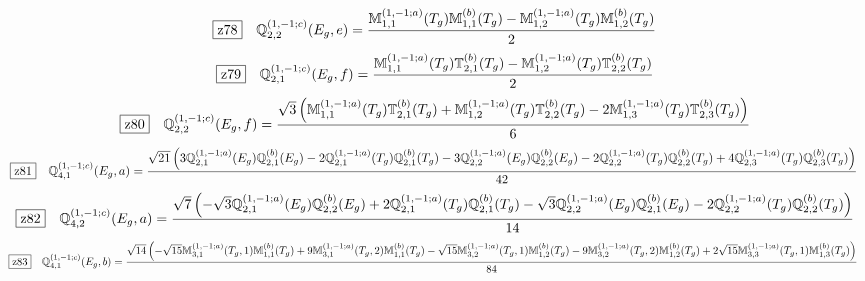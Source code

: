 \documentclass[fleqn,10pt,landscape]{jsarticle}
\begin{document}
\begin{dmath*}
\hspace*{3mm}\fbox{z78}\quad \mathbb{Q}_{2,2}^{(1,-1;c)}(E_{g},e)=\frac{\mathbb{M}_{1,1}^{(1,-1;a)}(T_{g}) \mathbb{M}_{1,1}^{(b)}(T_{g}) - \mathbb{M}_{1,2}^{(1,-1;a)}(T_{g}) \mathbb{M}_{1,2}^{(b)}(T_{g})}{2}
\end{dmath*}
\begin{dmath*}
\hspace*{3mm}\fbox{z79}\quad \mathbb{Q}_{2,1}^{(1,-1;c)}(E_{g},f)=\frac{\mathbb{M}_{1,1}^{(1,-1;a)}(T_{g}) \mathbb{T}_{2,1}^{(b)}(T_{g}) - \mathbb{M}_{1,2}^{(1,-1;a)}(T_{g}) \mathbb{T}_{2,2}^{(b)}(T_{g})}{2}
\end{dmath*}
\begin{dmath*}
\hspace*{3mm}\fbox{z80}\quad \mathbb{Q}_{2,2}^{(1,-1;c)}(E_{g},f)=\frac{\sqrt{3} \left(\mathbb{M}_{1,1}^{(1,-1;a)}(T_{g}) \mathbb{T}_{2,1}^{(b)}(T_{g}) + \mathbb{M}_{1,2}^{(1,-1;a)}(T_{g}) \mathbb{T}_{2,2}^{(b)}(T_{g}) - 2 \mathbb{M}_{1,3}^{(1,-1;a)}(T_{g}) \mathbb{T}_{2,3}^{(b)}(T_{g})\right)}{6}
\end{dmath*}
\begin{dmath*}
\hspace*{3mm}\fbox{z81}\quad \mathbb{Q}_{4,1}^{(1,-1;c)}(E_{g},a)=\frac{\sqrt{21} \left(3 \mathbb{Q}_{2,1}^{(1,-1;a)}(E_{g}) \mathbb{Q}_{2,1}^{(b)}(E_{g}) - 2 \mathbb{Q}_{2,1}^{(1,-1;a)}(T_{g}) \mathbb{Q}_{2,1}^{(b)}(T_{g}) - 3 \mathbb{Q}_{2,2}^{(1,-1;a)}(E_{g}) \mathbb{Q}_{2,2}^{(b)}(E_{g}) - 2 \mathbb{Q}_{2,2}^{(1,-1;a)}(T_{g}) \mathbb{Q}_{2,2}^{(b)}(T_{g}) + 4 \mathbb{Q}_{2,3}^{(1,-1;a)}(T_{g}) \mathbb{Q}_{2,3}^{(b)}(T_{g})\right)}{42}
\end{dmath*}
\begin{dmath*}
\hspace*{3mm}\fbox{z82}\quad \mathbb{Q}_{4,2}^{(1,-1;c)}(E_{g},a)=\frac{\sqrt{7} \left(- \sqrt{3} \mathbb{Q}_{2,1}^{(1,-1;a)}(E_{g}) \mathbb{Q}_{2,2}^{(b)}(E_{g}) + 2 \mathbb{Q}_{2,1}^{(1,-1;a)}(T_{g}) \mathbb{Q}_{2,1}^{(b)}(T_{g}) - \sqrt{3} \mathbb{Q}_{2,2}^{(1,-1;a)}(E_{g}) \mathbb{Q}_{2,1}^{(b)}(E_{g}) - 2 \mathbb{Q}_{2,2}^{(1,-1;a)}(T_{g}) \mathbb{Q}_{2,2}^{(b)}(T_{g})\right)}{14}
\end{dmath*}
\begin{dmath*}
\hspace*{3mm}\fbox{z83}\quad \mathbb{Q}_{4,1}^{(1,-1;c)}(E_{g},b)=\frac{\sqrt{14} \left(- \sqrt{15} \mathbb{M}_{3,1}^{(1,-1;a)}(T_{g},1) \mathbb{M}_{1,1}^{(b)}(T_{g}) + 9 \mathbb{M}_{3,1}^{(1,-1;a)}(T_{g},2) \mathbb{M}_{1,1}^{(b)}(T_{g}) - \sqrt{15} \mathbb{M}_{3,2}^{(1,-1;a)}(T_{g},1) \mathbb{M}_{1,2}^{(b)}(T_{g}) - 9 \mathbb{M}_{3,2}^{(1,-1;a)}(T_{g},2) \mathbb{M}_{1,2}^{(b)}(T_{g}) + 2 \sqrt{15} \mathbb{M}_{3,3}^{(1,-1;a)}(T_{g},1) \mathbb{M}_{1,3}^{(b)}(T_{g})\right)}{84}
\end{dmath*}
\end{document}
